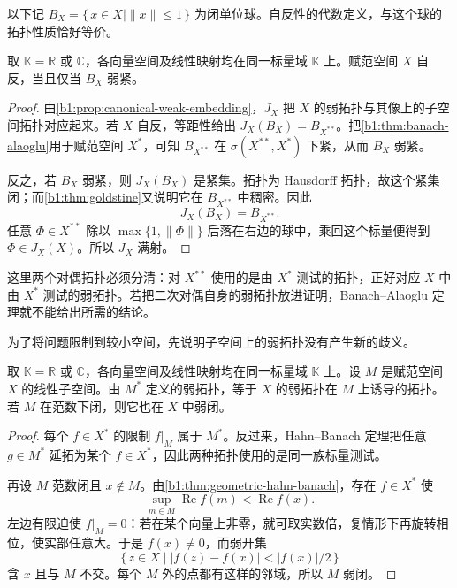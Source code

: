 以下记 \(B_X=\{\,x\in X\mid\|x\|\le1\,\}\) 为闭单位球。自反性的代数定义，与这个球的拓扑性质恰好等价。

\begin{theorem}[自反性的弱紧性判别]\label{b1:thm:reflexive-weak-compact}
取 \(\mathbb K=\mathbb R\) 或 \(\mathbb C\)，各向量空间及线性映射均在同一标量域 \(\mathbb K\) 上。赋范空间 \(X\) 自反，当且仅当 \(B_X\) 弱紧。
\end{theorem}
\begin{proof}
由\cref{b1:prop:canonical-weak-embedding}，\(J_X\) 把 \(X\) 的弱拓扑与其像上的\WeakStar{}子空间拓扑对应起来。若 \(X\) 自反，等距性给出 \(J_X(B_X)=B_{X^{**}}\)。把\cref{b1:thm:banach-alaoglu}用于赋范空间 \(X^*\)，可知 \(B_{X^{**}}\) 在 \(\sigma(X^{**},X^*)\) 下紧，从而 \(B_X\) 弱紧。

反之，若 \(B_X\) 弱紧，则 \(J_X(B_X)\) 是\WeakStar{}紧集。\WeakStar{}拓扑为 Hausdorff 拓扑，故这个紧集闭；而\cref{b1:thm:goldstine}又说明它在 \(B_{X^{**}}\) 中\WeakStar{}稠密。因此
\[
 J_X(B_X)=B_{X^{**}}.
\]
任意 \(\Phi\in X^{**}\) 除以 \(\max\{1,\|\Phi\|\}\) 后落在右边的球中，乘回这个标量便得到 \(\Phi\in J_X(X)\)。所以 \(J_X\) 满射。
\end{proof}

这里两个对偶拓扑必须分清：对 \(X^{**}\) 使用的是由 \(X^*\) 测试的\WeakStar{}拓扑，正好对应 \(X\) 中由 \(X^*\) 测试的弱拓扑。若把二次对偶自身的弱拓扑放进证明，Banach--Alaoglu 定理就不能给出所需的结论。

\ProseParagraphBreak

为了将问题限制到较小空间，先说明子空间上的弱拓扑没有产生新的歧义。

\begin{lemma}\label{b1:lem:weak-topology-subspace}
取 \(\mathbb K=\mathbb R\) 或 \(\mathbb C\)，各向量空间及线性映射均在同一标量域 \(\mathbb K\) 上。设 \(M\) 是赋范空间 \(X\) 的线性子空间。由 \(M^*\) 定义的弱拓扑，等于 \(X\) 的弱拓扑在 \(M\) 上诱导的拓扑。若 \(M\) 在范数下闭，则它也在 \(X\) 中弱闭。
\end{lemma}
\begin{proof}
每个 \(f\in X^*\) 的限制 \(f|_M\) 属于 \(M^*\)。反过来，Hahn--Banach 定理把任意 \(g\in M^*\) 延拓为某个 \(f\in X^*\)，因此两种拓扑使用的是同一族标量测试。

再设 \(M\) 范数闭且 \(x\notin M\)。由\cref{b1:thm:geometric-hahn-banach}，存在 \(f\in X^*\) 使
\[
 \sup_{m\in M}\operatorname{Re}f(m)<\operatorname{Re}f(x).
\]
左边有限迫使 \(f|_M=0\)：若在某个向量上非零，就可取实数倍，复情形下再旋转相位，使实部任意大。于是 \(f(x)\ne0\)，而弱开集
\[
 \{\,z\in X\mid |f(z)-f(x)|<|f(x)|/2\,\}
\]
含 \(x\) 且与 \(M\) 不交。每个 \(M\) 外的点都有这样的邻域，所以 \(M\) 弱闭。
\end{proof}

